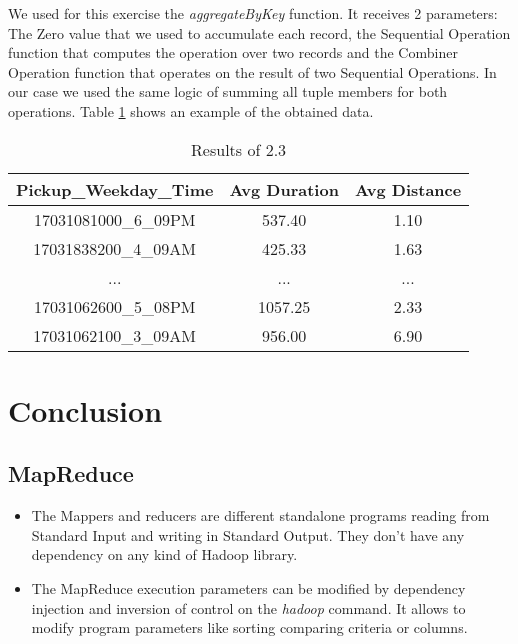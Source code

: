 \documentclass[conference,compsoc]{IEEEtran}
\begin{document}
We used for this exercise the \textit{aggregateByKey} function. It receives 2 parameters: The Zero value that we used to accumulate each record, the Sequential Operation function that computes the operation over two records and the Combiner Operation function that operates on the result of two Sequential Operations. In our case we used the same logic of summing all tuple members for both operations. Table \ref{output_2_3} shows an example of the obtained data.

\begin{table}[!t]
\renewcommand{\arraystretch}{1.3}
\caption{Results of 2.3}
\label{output_2_3}
\centering
\begin{tabular}{c||c|c}
\hline
\bfseries Pickup\_Weekday\_Time & \bfseries Avg Duration & \bfseries Avg Distance\\
\hline\hline
17031081000\_6\_09PM & 537.40 & 1.10\\
17031838200\_4\_09AM & 425.33 & 1.63\\
... & ... & ...\\
17031062600\_5\_08PM & 1057.25 & 2.33\\
17031062100\_3\_09AM & 956.00 & 6.90\\
\hline
\end{tabular}
\end{table}
\section{Conclusion}

\subsection{MapReduce}
\begin{itemize}
\item The Mappers and reducers are different standalone programs reading from Standard Input and writing in Standard Output. They don't have any dependency on any kind of Hadoop library.
\item The MapReduce execution parameters can be modified by dependency injection and inversion of control on the \textit{hadoop} command. It allows to modify program parameters like sorting comparing criteria or columns.
\end{itemize}
\end{document}

